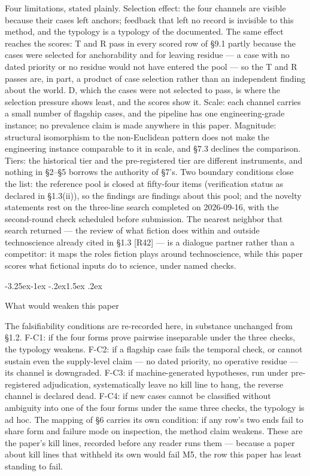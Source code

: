 \documentclass[11pt,a4paper]{article}
\makeatletter
\renewcommand\subsection{\@startsection{subsection}{2}{\z@}%
  {-3.25ex\@plus -1ex \@minus -.2ex}{1.5ex \@plus .2ex}%
  {\normalfont\large\bfseries\raggedright}}
\makeatother
\begin{document}
Four limitations, stated plainly. Selection effect: the four channels are visible because their cases left anchors; feedback that left no record is invisible to this method, and the typology is a typology of the documented. The same effect reaches the scores: T and R pass in every scored row of §9.1 partly because the cases were selected for anchorability and for leaving residue — a case with no dated priority or no residue would not have entered the pool — so the T and R passes are, in part, a product of case selection rather than an independent finding about the world. D, which the cases were not selected to pass, is where the selection pressure shows least, and the scores show it. Scale: each channel carries a small number of flagship cases, and the pipeline has one engineering-grade instance; no prevalence claim is made anywhere in this paper. Magnitude: structural isomorphism to the non-Euclidean pattern does not make the engineering instance comparable to it in scale, and §7.3 declines the comparison. Tiers: the historical tier and the pre-registered tier are different instruments, and nothing in §2–§5 borrows the authority of §7's. Two boundary conditions close the list: the reference pool is closed at fifty-four items (verification status as declared in §1.3(ii)), so the findings are findings about this pool; and the novelty statements rest on the three-line search completed on 2026-09-16, with the second-round check scheduled before submission. The nearest neighbor that search returned — the review of what fiction does within and outside technoscience already cited in §1.3 [R42] — is a dialogue partner rather than a competitor: it maps the roles fiction plays around technoscience, while this paper scores what fictional inputs do to science, under named checks.

\subsection{What would weaken this paper}

The falsifiability conditions are re-recorded here, in substance unchanged from §1.2. F-C1: if the four forms prove pairwise inseparable under the three checks, the typology weakens. F-C2: if a flagship case fails the temporal check, or cannot sustain even the supply-level claim — no dated priority, no operative residue — its channel is downgraded. F-C3: if machine-generated hypotheses, run under pre-registered adjudication, systematically leave no kill line to hang, the reverse channel is declared dead. F-C4: if new cases cannot be classified without ambiguity into one of the four forms under the same three checks, the typology is ad hoc. The mapping of §6 carries its own condition: if any row's two ends fail to share form and failure mode on inspection, the method claim weakens. These are the paper's kill lines, recorded before any reader runs them — because a paper about kill lines that withheld its own would fail M5, the row this paper has least standing to fail.
\end{document}
